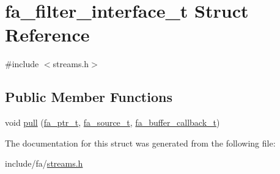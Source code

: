 \hypertarget{structfa__filter__interface__t}{\section{fa\-\_\-filter\-\_\-interface\-\_\-t Struct Reference}
\label{structfa__filter__interface__t}
}


{\ttfamily \#include $<$streams.\-h$>$}

\subsection*{Public Member Functions}
\begin{DoxyCompactItemize}
\item 
void \hyperlink{group___fa_ga2cd3877996d26ff419d03066055c465d}{pull} (\hyperlink{group___fa_ga915ddeae99ad7568b273d2b876425197}{fa\-\_\-ptr\-\_\-t}, \hyperlink{group___fa_streams_ga7c5db08c833038bdbec81bf266c7f6f4}{fa\-\_\-source\-\_\-t}, \hyperlink{group___fa_streams_ga9f9c29b1d06e16f886e1458cbf3d827f}{fa\-\_\-buffer\-\_\-callback\-\_\-t})
\end{DoxyCompactItemize}


The documentation for this struct was generated from the following file\-:\begin{DoxyCompactItemize}
\item 
include/fa/\hyperlink{streams_8h}{streams.\-h}\end{DoxyCompactItemize}
